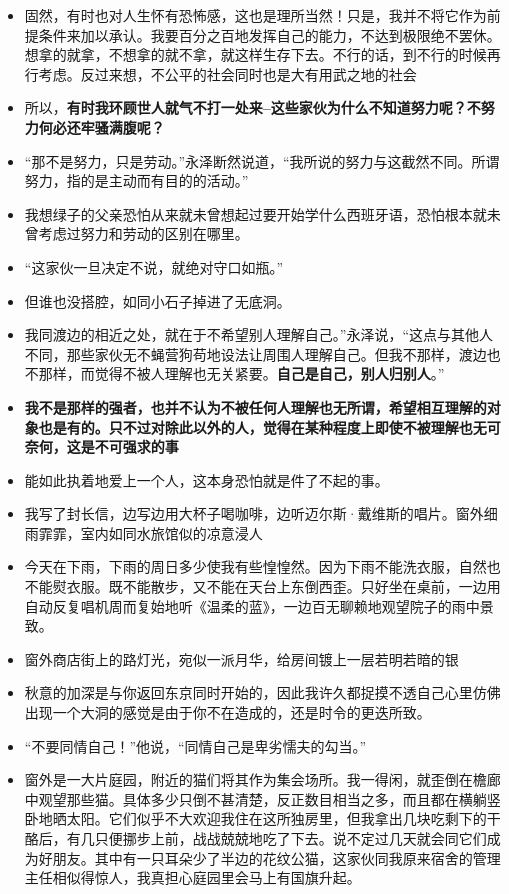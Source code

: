\documentclass[UTF8,a4paper,8pt]{ctexart}
\begin{document}
\begin{itemize}
 	\item 固然，有时也对人生怀有恐怖感，这也是理所当然！只是，我并不将它作为前提条件来加以承认。我要百分之百地发挥自己的能力，不达到极限绝不罢休。想拿的就拿，不想拿的就不拿，就这样生存下去。不行的话，到不行的时候再行考虑。反过来想，不公平的社会同时也是大有用武之地的社会
 	\item 所以，\textbf{有时我环顾世人就气不打一处来--这些家伙为什么不知道努力呢？不努力何必还牢骚满腹呢？}
 	\item “那不是努力，只是劳动。”永泽断然说道，“我所说的努力与这截然不同。所谓努力，指的是主动而有目的的活动。”
 	\item 我想绿子的父亲恐怕从来就未曾想起过要开始学什么西班牙语，恐怕根本就未曾考虑过努力和劳动的区别在哪里。
 	\item “这家伙一旦决定不说，就绝对守口如瓶。”
 	\item 但谁也没搭腔，如同小石子掉进了无底洞。
 	\item 我同渡边的相近之处，就在于不希望别人理解自己。”永泽说，“这点与其他人不同，那些家伙无不蝇营狗苟地设法让周围人理解自己。但我不那样，渡边也不那样，而觉得不被人理解也无关紧要。\textbf{自己是自己，别人归别人}。”
 	\item \textbf{我不是那样的强者，也并不认为不被任何人理解也无所谓，希望相互理解的对象也是有的。只不过对除此以外的人，觉得在某种程度上即使不被理解也无可奈何，这是不可强求的事}
 	\item 能如此执着地爱上一个人，这本身恐怕就是件了不起的事。
 	\item 我写了封长信，边写边用大杯子喝咖啡，边听迈尔斯·戴维斯的唱片。窗外细雨霏霏，室内如同水旅馆似的凉意浸人
 	\item 今天在下雨，下雨的周日多少使我有些惶惶然。因为下雨不能洗衣服，自然也不能熨衣服。既不能散步，又不能在天台上东倒西歪。只好坐在桌前，一边用自动反复唱机周而复始地听《温柔的蓝》，一边百无聊赖地观望院子的雨中景致。
 	\item 窗外商店街上的路灯光，宛似一派月华，给房间镀上一层若明若暗的银
 	\item 秋意的加深是与你返回东京同时开始的，因此我许久都捉摸不透自己心里仿佛出现一个大洞的感觉是由于你不在造成的，还是时令的更迭所致。
 	\item “不要同情自己！”他说，“同情自己是卑劣懦夫的勾当。”
 	\item 窗外是一大片庭园，附近的猫们将其作为集会场所。我一得闲，就歪倒在檐廊中观望那些猫。具体多少只倒不甚清楚，反正数目相当之多，而且都在横躺竖卧地晒太阳。它们似乎不大欢迎我住在这所独房里，但我拿出几块吃剩下的干酪后，有几只便挪步上前，战战兢兢地吃了下去。说不定过几天就会同它们成为好朋友。其中有一只耳朵少了半边的花纹公猫，这家伙同我原来宿舍的管理主任相似得惊人，我真担心庭园里会马上有国旗升起。

\end{itemize}
\end{document}
